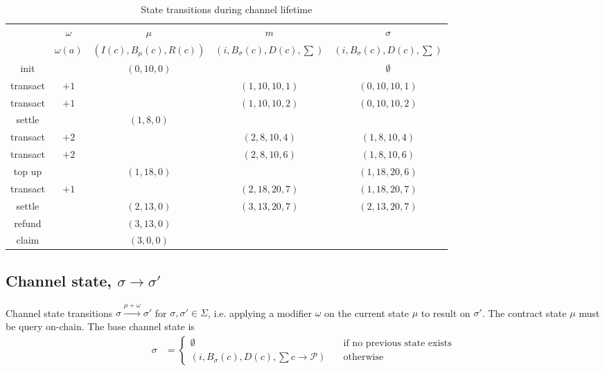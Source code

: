 \documentclass{llncs}
\begin{document}
\begin{table}[t]
  \begin{tabularx}{\textwidth}{| S | S | C | C | C |}
       & $\omega$ & $\mu$ & $m$ & $\sigma$ \\ 
       & $\omega(a)$ & $(I(c), B_\mu(c),R(c))$ & $(i, B_\sigma(c), D(c), \sum)$ & $(i, B_\sigma(c), D(c), \sum)$ \\
  \hhline{-====}
      init & & $(0,10,0)$ & & $\emptyset$ \\
      transact & $+1$ & & $(1, 10, 10, 1)$& $(0, 10, 10, 1)$ \\
      transact & $+1$ & & $(1, 10, 10, 2)$& $(0, 10, 10, 2)$ \\
      settle & & $(1,8,0)$ & & \\
      transact & $+2$  & & $(2, 8, 10, 4)$ & $(1, 8, 10, 4)$ \\
      transact & $+2$  & & $(2, 8, 10, 6)$ & $(1, 8, 10, 6)$ \\
      top up & & $(1,18,0)$ & & $(1, 18, 20, 6)$ \\
      transact & $+1$ & & $(2, 18, 20, 7)$ & $(1, 18, 20, 7)$ \\
      settle & & $(2,13,0)$ & $(3,13,20,7)$ & $(2,13,20,7)$ \\
      refund & & $(3,13,0)$ & & \\
      claim & & $(3,0,0)$ & & \\
  \end{tabularx}
  \medskip
  \caption{State transitions during channel lifetime}
\end{table}

\subsection{Channel state, $\sigma \rightarrow \sigma'$} Channel state transitions $\sigma \xrightarrow{\mu + \omega} \sigma'$ for $\sigma, \sigma' \in \Sigma$, i.e. applying a modifier $\omega$ on the current state $\mu$ to result on $\sigma'$. The contract state $\mu$ must be query on-chain. The base channel state is
\begin{equation*}
\begin{split}
  \sigma &=
  \begin{cases}
    \emptyset & \quad \text{if no previous state exists} \\
    (i, B_\sigma(c), D(c), \textstyle \sum c \rightarrow \mathcal{P}) & \quad \text{otherwise}
  \end{cases}
\end{split}
\end{equation*}
\end{document}
